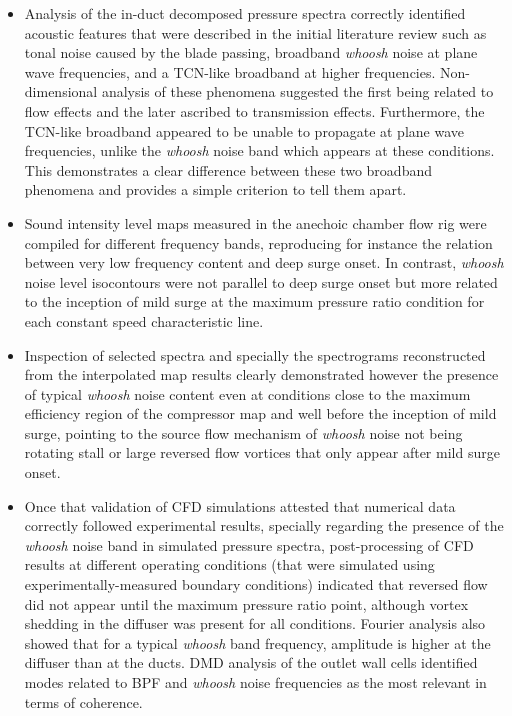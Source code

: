 \begin{itemize}
	\item Analysis of the in-duct decomposed pressure spectra correctly identified acoustic features that were described in the initial literature review such as tonal noise caused by the blade passing,  broadband \emph{whoosh} noise at plane wave frequencies, and a TCN-like broadband at higher frequencies. Non-dimensional analysis of these phenomena suggested the first being related to flow effects and the later ascribed to transmission effects. Furthermore, the TCN-like broadband appeared to be unable to propagate at plane wave frequencies, unlike the \emph{whoosh} noise band which appears at these conditions. This demonstrates a clear difference between these two broadband phenomena and provides a simple criterion to tell them apart.

	\item Sound intensity level maps measured in the anechoic chamber flow rig were compiled for different frequency bands, reproducing for instance the relation between very low frequency content and deep surge onset. In contrast, \emph{whoosh} noise level isocontours were not parallel to deep surge onset but more related to the inception of mild surge at the maximum pressure ratio condition for each constant speed characteristic line.

	\item Inspection of selected spectra and specially the spectrograms reconstructed from the interpolated map results clearly demonstrated however the presence of typical \emph{whoosh} noise content even at conditions close to the maximum efficiency region of the compressor map and well before the inception of mild surge, pointing to the source flow mechanism of \emph{whoosh} noise not being rotating stall or large reversed flow vortices  that only appear after mild surge onset.

	\item Once that validation of CFD simulations attested that numerical data correctly followed experimental results, specially regarding the presence of the \emph{whoosh} noise band in simulated pressure spectra, post-processing of CFD results at different operating conditions (that were simulated using experimentally-measured boundary conditions) indicated that reversed flow did not appear until the maximum pressure ratio point, although vortex shedding in the diffuser was present for all conditions. Fourier analysis also showed that for a typical \emph{whoosh} band frequency, amplitude is higher at the diffuser than at the ducts. DMD analysis of the outlet wall cells identified modes related to BPF and \emph{whoosh} noise frequencies as the most relevant in terms of coherence.


\end{itemize}

